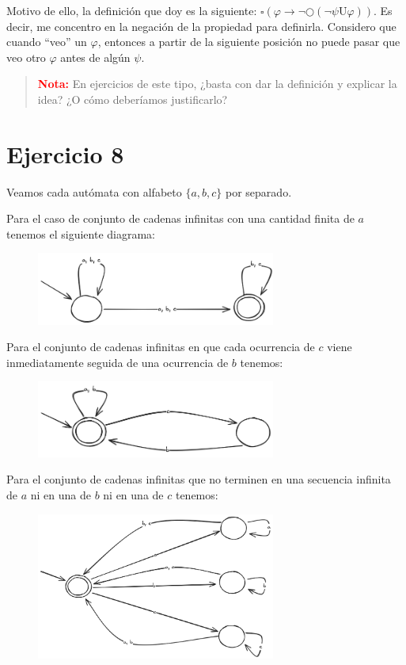 \documentclass{article}
\begin{document}
Motivo de ello, la definición que doy es la siguiente: $\square(\varphi \to \neg\bigcirc(\neg\psi \text{U} \varphi))$.
Es decir, me concentro en la negación de la propiedad para definirla.
Considero que cuando ``veo'' un $\varphi$, entonces a partir de la siguiente posición no puede pasar que veo otro $\varphi$ antes de algún $\psi$.

\begin{quotation}
	\textbf{\textcolor{Red}{Nota:}} En ejercicios de este tipo, ¿basta con dar la definición y explicar la idea? ¿O cómo deberíamos justificarlo?
\end{quotation}

\section*{Ejercicio 8}
Veamos cada autómata con alfabeto $\{a, b, c\}$ por separado.

Para el caso de conjunto de cadenas infinitas con una cantidad finita de $a$ tenemos el siguiente diagrama:
\begin{figure}[!htb]
	\includegraphics[width=0.7\textwidth]{04-08-a.png}
	\centering
\end{figure}

Para el conjunto de cadenas infinitas en que cada ocurrencia de $c$ viene inmediatamente seguida de una ocurrencia de $b$ tenemos:
\begin{figure}[!htb]
	\includegraphics[width=0.7\textwidth]{04-08-b.png}
	\centering
\end{figure}

Para el conjunto de cadenas infinitas que no terminen en una secuencia infinita de $a$ ni en una de $b$ ni en una de $c$ tenemos:
\begin{figure}[!htb]
	\includegraphics[width=0.7\textwidth]{04-08-c.png}
	\centering
\end{figure}
\end{document}
